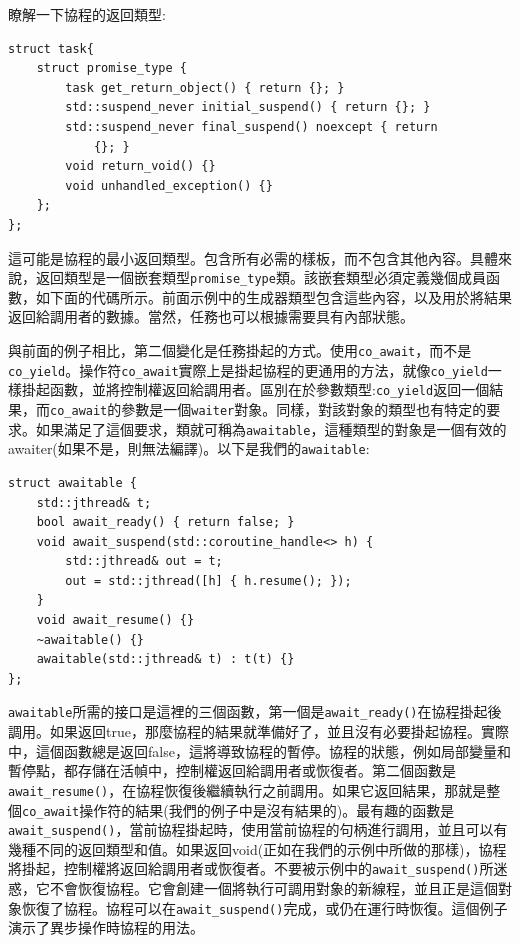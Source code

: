 瞭解一下協程的返回類型:

\begin{lstlisting}[style=styleCXX]
struct task{
	struct promise_type {
		task get_return_object() { return {}; }
		std::suspend_never initial_suspend() { return {}; }
		std::suspend_never final_suspend() noexcept { return 
			{}; }
		void return_void() {}
		void unhandled_exception() {}
	};
};
\end{lstlisting}

這可能是協程的最小返回類型。包含所有必需的樣板，而不包含其他內容。具體來說，返回類型是一個嵌套類型\texttt{promise\_type}類。該嵌套類型必須定義幾個成員函數，如下面的代碼所示。前面示例中的生成器類型包含這些內容，以及用於將結果返回給調用者的數據。當然，任務也可以根據需要具有內部狀態。

與前面的例子相比，第二個變化是任務掛起的方式。使用\texttt{co\_await}，而不是\texttt{co\_yield}。操作符\texttt{co\_await}實際上是掛起協程的更通用的方法，就像\texttt{co\_yield}一樣掛起函數，並將控制權返回給調用者。區別在於參數類型:\texttt{co\_yield}返回一個結果，而\texttt{co\_await}的參數是一個\texttt{waiter}對象。同樣，對該對象的類型也有特定的要求。如果滿足了這個要求，類就可稱為\texttt{awaitable}，這種類型的對象是一個有效的awaiter(如果不是，則無法編譯)。以下是我們的\texttt{awaitable}:

\begin{lstlisting}[style=styleCXX]
struct awaitable {
	std::jthread& t;
	bool await_ready() { return false; }
	void await_suspend(std::coroutine_handle<> h) {
		std::jthread& out = t;
		out = std::jthread([h] { h.resume(); });
	}
	void await_resume() {}
	~awaitable() {}
	awaitable(std::jthread& t) : t(t) {}
};
\end{lstlisting}

\texttt{awaitable}所需的接口是這裡的三個函數，第一個是\texttt{await\_ready()}在協程掛起後調用。如果返回true，那麼協程的結果就準備好了，並且沒有必要掛起協程。實際中，這個函數總是返回false，這將導致協程的暫停。協程的狀態，例如局部變量和暫停點，都存儲在活幀中，控制權返回給調用者或恢復者。第二個函數是\texttt{await\_resume()}，在協程恢復後繼續執行之前調用。如果它返回結果，那就是整個\texttt{co\_await}操作符的結果(我們的例子中是沒有結果的)。最有趣的函數是\texttt{await\_suspend()}，當前協程掛起時，使用當前協程的句柄進行調用，並且可以有幾種不同的返回類型和值。如果返回void(正如在我們的示例中所做的那樣)，協程將掛起，控制權將返回給調用者或恢復者。不要被示例中的\texttt{await\_suspend()}所迷惑，它不會恢復協程。它會創建一個將執行可調用對象的新線程，並且正是這個對象恢復了協程。協程可以在\texttt{await\_suspend()}完成，或仍在運行時恢復。這個例子演示了異步操作時協程的用法。 

